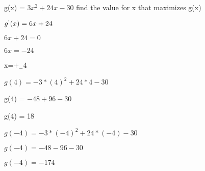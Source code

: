 \documentclass[11pt]{article}
\begin{document}
g(x) = $3x^2+24x-30$ find the value for x that maximizes g(x)
 
$g^`(x) = 6x+24$

$6x+24=0$

$6x=-24$

x=$+_-4$

$g(4) = -3*(4)^2+24*4-30$

g(4) = $-48+96-30$

g(4) = 18

$g(-4) = -3*(-4)^2+24*(-4)-30$

$g(-4) = -48-96-30$

$g(-4) = -174$
\end{document}
